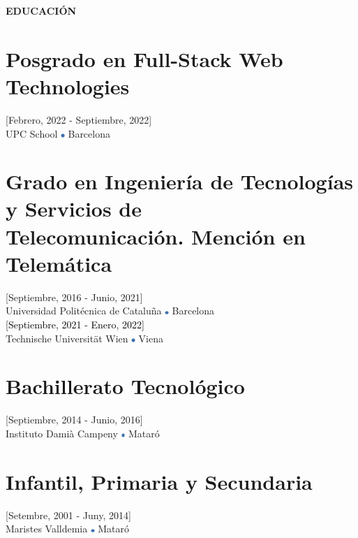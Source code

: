 \documentclass[../main.tex]{subfiles}
\begin{document}
    \vspace*{0.5cm}
    \textbf{\textcolor{myCV2}{EDUCACIÓN\underline{\hspace{7.5cm}}}}
        \vspace*{-0.3cm}
        
        \section*{Posgrado en Full-Stack Web Technologies}
        \vspace*{-0.4cm}
        [Febrero, 2022 - Septiembre, 2022] \\
        UPC School
        \includegraphics[width=0.15cm]{assets/blue.png} 
        Barcelona
        
        \vspace*{-0.25cm}
        \section*{Grado en Ingeniería de Tecnologías y Servicios de \\Telecomunicación. Mención en Telemática}
        \vspace*{-0.4cm}
        [Septiembre, 2016 - Junio, 2021] \\
        Universidad Politécnica de Cataluña 
        \includegraphics[width=0.15cm]{assets/blue.png} 
        Barcelona \\
        \textcolor{black}{[Septiembre, 2021 - Enero, 2022]}\\
        Technische Universität Wien
        \includegraphics[width=0.15cm]{assets/blue.png} 
        Viena
        
        \vspace*{-0.25cm}
        \section*{Bachillerato Tecnológico}
        \vspace*{-0.4cm}
        [Septiembre, 2014 - Junio, 2016] \\
        Instituto Damià Campeny
        \includegraphics[width=0.15cm]{assets/blue.png} 
        Mataró

        \vspace*{-0.25cm}
        \section*{Infantil, Primaria y Secundaria}
        \vspace*{-0.4cm}
        [Setembre, 2001 - Juny, 2014]\\
        Maristes Valldemia
        \includegraphics[width=0.15cm]{assets/blue.png} 
        Mataró
\end{document}

